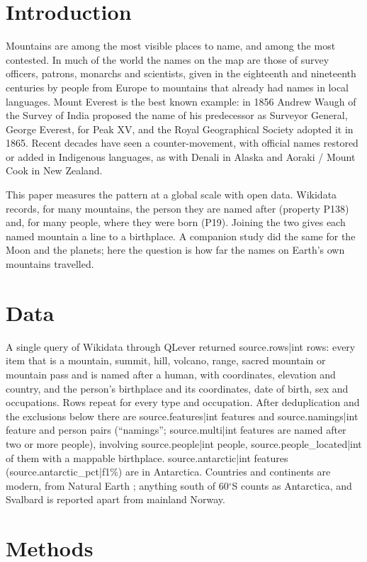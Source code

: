 \documentclass[11pt,a4paper]{article}
\begin{document}
\section{Introduction}
Mountains are among the most visible places to name, and among the most contested. In much of the world the names on the map are those of survey officers, patrons, monarchs and scientists, given in the eighteenth and nineteenth centuries by people from Europe to mountains that already had names in local languages. Mount Everest is the best known example: in 1856 Andrew Waugh of the Survey of India proposed the name of his predecessor as Surveyor General, George Everest, for Peak XV, and the Royal Geographical Society adopted it in 1865. Recent decades have seen a counter-movement, with official names restored or added in Indigenous languages, as with Denali in Alaska and Aoraki / Mount Cook in New Zealand.

This paper measures the pattern at a global scale with open data. Wikidata \citep{wikidata} records, for many mountains, the person they are named after (property P138) and, for many people, where they were born (P19). Joining the two gives each named mountain a line to a birthplace. A companion study did the same for the Moon and the planets; here the question is how far the names on Earth's own mountains travelled.

\section{Data}
A single query of Wikidata through QLever \citep{qlever} returned {{source.rows|int}} rows: every item that is a mountain, summit, hill, volcano, range, sacred mountain or mountain pass and is named after a human, with coordinates, elevation and country, and the person's birthplace and its coordinates, date of birth, sex and occupations. Rows repeat for every type and occupation. After deduplication and the exclusions below there are {{source.features|int}} features and {{source.namings|int}} feature and person pairs (``namings''; {{source.multi|int}} features are named after two or more people), involving {{source.people|int}} people, {{source.people_located|int}} of them with a mappable birthplace. {{source.antarctic|int}} features ({{source.antarctic_pct|f1}}\%) are in Antarctica. Countries and continents are modern, from Natural Earth \citep{naturalearth}; anything south of 60$^\circ$S counts as Antarctica, and Svalbard is reported apart from mainland Norway.

\section{Methods}
\end{document}
